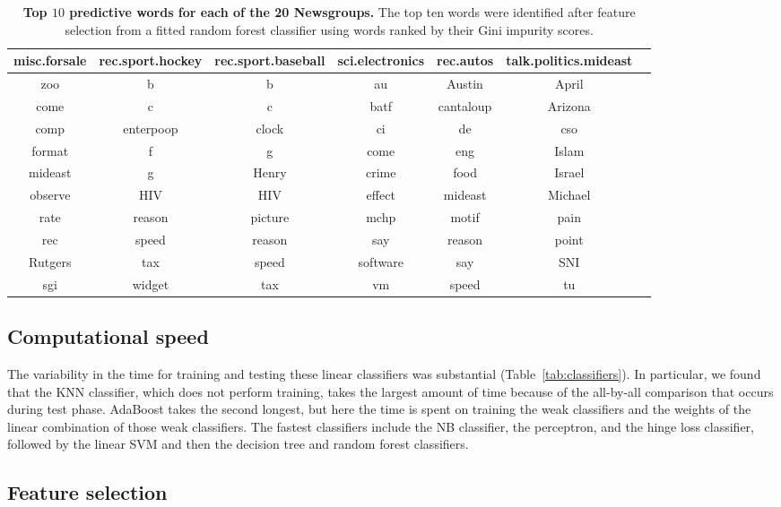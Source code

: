 \documentclass{article} %
\begin{document}
\begin{table}[htbp]
\begin{tabular}{@{}|c|c|c|c|c|c|c|@{}}
      \hline
 misc.forsale & rec.sport.hockey & rec.sport.baseball & sci.electronics & rec.autos & talk.politics.mideast & \\ \hline \hline
   zoo & b & b & au & Austin & April&\\
   come  & c & c & batf & cantaloup & Arizona&\\
   comp & enterpoop & clock & ci & de & cso&\\
   format & f & g & come & eng & Islam&\\
   mideast & g & Henry & crime & food & Israel&\\
   observe & HIV & HIV & effect & mideast & Michael&\\
   rate & reason & picture & mchp & motif & pain&\\
   rec & speed & reason & say & reason & point&\\
   Rutgers & tax & speed & software & say & SNI&\\ 
   sgi & widget & tax & vm & speed & tu&\\ \hline
   \end{tabular}
   \caption{{\bf Top $10$ predictive words for each of the 20 Newsgroups.} The top ten words were identified after feature selection from a fitted random forest classifier using words ranked by their Gini impurity scores.}
   \label{tab:words}
\end{table}

\subsection{Computational speed}

The variability in the time for training and testing these linear classifiers was substantial (Table~\ref{tab:classifiers}). In particular, we found that the KNN classifier, which does not perform training, takes the largest amount of time because of the all-by-all comparison that occurs during test phase. AdaBoost takes the second longest, but here the time is spent on training the weak classifiers and the weights of the linear combination of those weak classifiers. The fastest classifiers include the NB classifier, the perceptron, and the hinge loss classifier, followed by the linear SVM and then the decision tree and random forest classifiers.

\subsection{Feature selection}
\end{document}
